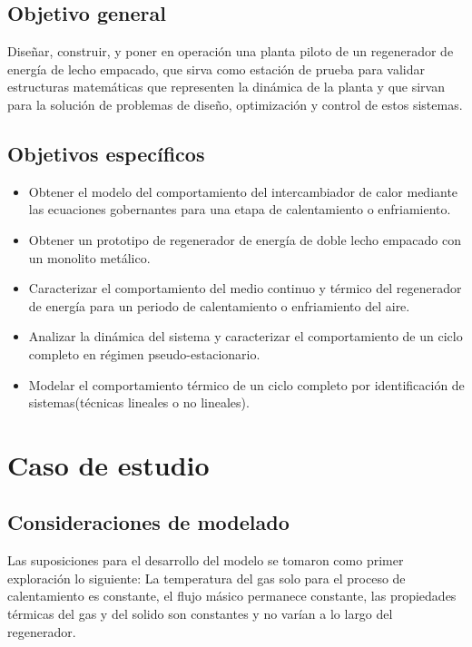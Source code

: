 \documentclass[12pt,letterpaper,final]{article}%
\begin{document}
\subsection{Objetivo general}
Diseñar, construir, y poner en operaci\'on una planta piloto de un regenerador de energ\'ia de lecho empacado, que sirva como estaci\'on de prueba para validar estructuras matem\'aticas que representen la din\'amica de la
planta y que sirvan para la soluci\'on de problemas de diseño, optimizaci\'on y control de estos sistemas.
\subsection{Objetivos espec\'ificos}
\begin{itemize}
	\item Obtener el modelo del comportamiento del intercambiador de calor mediante las ecuaciones gobernantes para una etapa de calentamiento o enfriamiento.
	\item Obtener un prototipo  de regenerador de energía de doble lecho empacado con un monolito metálico.
	\item Caracterizar el comportamiento del medio continuo y térmico del regenerador de energía para un periodo de calentamiento o enfriamiento del aire.
	\item Analizar la dinámica del sistema y caracterizar el comportamiento de un ciclo completo en régimen pseudo-estacionario.
	\item Modelar el comportamiento térmico de un ciclo completo por identificación de sistemas(técnicas lineales o no lineales).
	
\end{itemize}
\newpage
\section{Caso de estudio}
\subsection{Consideraciones de modelado }
Las suposiciones para el desarrollo del modelo se tomaron como primer exploración lo siguiente: La temperatura del gas solo para el proceso de calentamiento es constante, el flujo másico permanece constante, las propiedades térmicas del gas y del solido son constantes y no varían a lo largo del regenerador.
\end{document}
